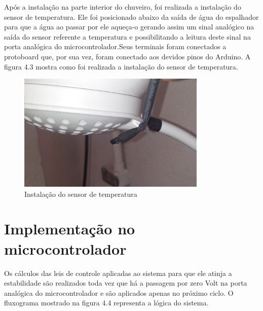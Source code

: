 Após a instalação na parte interior do chuveiro, foi realizada a instalação do sensor de temperatura. Ele foi posicionado abaixo da saída de água do espalhador para que a água ao passar por ele aqueça-o gerando assim um sinal analógico na saída do sensor referente a temperatura e possibilitando a leitura deste sinal na porta analógica do microcontrolador.Seus terminais foram conectados a protoboard que, por sua vez, foram conectado aos devidos pinos do Arduino. A figura 4.3 mostra como foi realizada a instalação do sensor de temperatura.


\begin{figure}[H]

\center

\includegraphics[width=9cm]{imagens/sensor_espalhador.jpg}

\label{Instalação do sensor de temperatura}

\caption{Instalação do sensor de temperatura}

\end{figure}


\section{Implementação no microcontrolador}

Os cálculos das leis de controle aplicadas ao sistema para que ele atinja a estabilidade são realizados toda vez que há a passagem por zero Volt na porta analógica do microcontrolador e são aplicados apenas no próximo ciclo.
O fluxograma mostrado na figura 4.4 representa a lógica do sistema.


